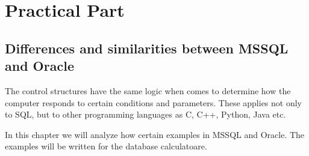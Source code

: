 \section{Practical Part}

\subsection{Differences and similarities between MSSQL and Oracle}

The control structures have the same logic when comes to determine how the computer responds to certain conditions and parameters. These applies not only to SQL, but to other programming languages as C, C++, Python, Java etc.

In this chapter we will analyze how certain examples  in MSSQL and Oracle. The examples will be written for the database calculatoare.

